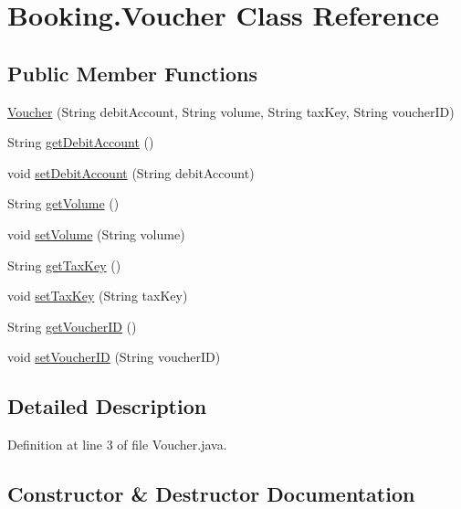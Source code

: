 \hypertarget{class_booking_1_1_voucher}{}\section{Booking.\+Voucher Class Reference}
\label{class_booking_1_1_voucher}
\subsection*{Public Member Functions}
\begin{DoxyCompactItemize}
\item 
\hyperlink{class_booking_1_1_voucher_a881680476cac22ad99e26c52193a4f5c}{Voucher} (String debit\+Account, String volume, String tax\+Key, String voucher\+ID)
\item 
String \hyperlink{class_booking_1_1_voucher_a4b942f6a41a9038f54196e667a7688c7}{get\+Debit\+Account} ()
\item 
void \hyperlink{class_booking_1_1_voucher_af2c5d763ce31b68b1ed7f92c844e4c49}{set\+Debit\+Account} (String debit\+Account)
\item 
String \hyperlink{class_booking_1_1_voucher_ac2eb353f82c098d06328fbbe825ba741}{get\+Volume} ()
\item 
void \hyperlink{class_booking_1_1_voucher_a5b5777ab768d3749fe5daa725fa5a507}{set\+Volume} (String volume)
\item 
String \hyperlink{class_booking_1_1_voucher_a3885a881d074c6345416f00c5cb98363}{get\+Tax\+Key} ()
\item 
void \hyperlink{class_booking_1_1_voucher_a1d1f825e65f9fd2b359f003c6cfb6f4f}{set\+Tax\+Key} (String tax\+Key)
\item 
String \hyperlink{class_booking_1_1_voucher_a6079148db64db2ff733814b62da06aaa}{get\+Voucher\+ID} ()
\item 
void \hyperlink{class_booking_1_1_voucher_a0e52da265a43c2ef797fcd1612f597ff}{set\+Voucher\+ID} (String voucher\+ID)
\end{DoxyCompactItemize}


\subsection{Detailed Description}


Definition at line 3 of file Voucher.\+java.



\subsection{Constructor \& Destructor Documentation}
